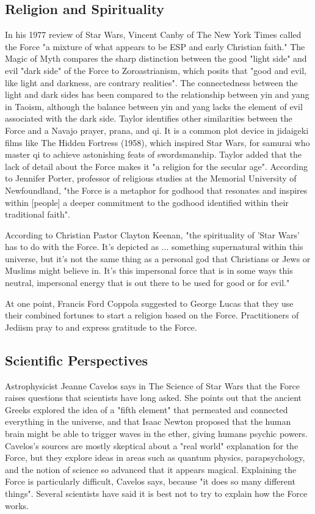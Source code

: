 \documentclass{ruthesis}
\begin{document}
\subsection{Religion and Spirituality}
In his 1977 review of Star Wars, Vincent Canby of The New York Times called the Force "a mixture of what appears to be ESP and early Christian faith." The Magic of Myth compares the sharp distinction between the good "light side" and evil "dark side" of the Force to Zoroastrianism, which posits that "good and evil, like light and darkness, are contrary realities". The connectedness between the light and dark sides has been compared to the relationship between yin and yang in Taoism, although the balance between yin and yang lacks the element of evil associated with the dark side. Taylor identifies other similarities between the Force and a Navajo prayer, prana, and qi. It is a common plot device in jidaigeki films like The Hidden Fortress (1958), which inspired Star Wars, for samurai who master qi to achieve astonishing feats of swordsmanship. Taylor added that the lack of detail about the Force makes it "a religion for the secular age". According to Jennifer Porter, professor of religious studies at the Memorial University of Newfoundland, "the Force is a metaphor for godhood that resonates and inspires within [people] a deeper commitment to the godhood identified within their traditional faith".

According to Christian Pastor Clayton Keenan, "the spirituality of 'Star Wars' has to do with the Force. It's depicted as ... something supernatural within this universe, but it's not the same thing as a personal god that Christians or Jews or Muslims might believe in. It's this impersonal force that is in some ways this neutral, impersonal energy that is out there to be used for good or for evil."

At one point, Francis Ford Coppola suggested to George Lucas that they use their combined fortunes to start a religion based on the Force. Practitioners of Jediism pray to and express gratitude to the Force.

\subsection{Scientific Perspectives}

Astrophysicist Jeanne Cavelos says in The Science of Star Wars that the Force raises questions that scientists have long asked. She points out that the ancient Greeks explored the idea of a "fifth element" that permeated and connected everything in the universe, and that Isaac Newton proposed that the human brain might be able to trigger waves in the ether, giving humans psychic powers. Cavelos's sources are mostly skeptical about a "real world" explanation for the Force, but they explore ideas in areas such as quantum physics, parapsychology, and the notion of science so advanced that it appears magical. Explaining the Force is particularly difficult, Cavelos says, because "it does so many different things". Several scientists have said it is best not to try to explain how the Force works.
\end{document}
